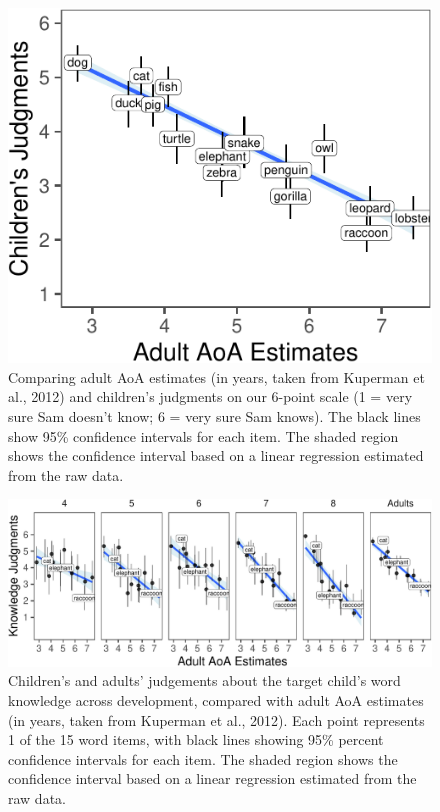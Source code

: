 \documentclass[10pt, letterpaper]{article}
\newenvironment{CodeChunk}{}{}
\begin{document}
\begin{CodeChunk}
\begin{figure}[tb]
\includegraphics{figs/overall-1} \caption[Comparing adult AoA estimates (in years, taken from Kuperman et al., 2012) and children’s judgments on our 6-point scale (1 = very sure Sam doesn’t know]{Comparing adult AoA estimates (in years, taken from Kuperman et al., 2012) and children’s judgments on our 6-point scale (1 = very sure Sam doesn’t know; 6 = very sure Sam knows). The black lines show 95\% confidence intervals for each item. The shaded region shows the confidence interval based on a linear regression estimated from the raw data.}\label{fig:overall}
\end{figure}
\end{CodeChunk}

\begin{CodeChunk}
\begin{figure}[tb]
\includegraphics{figs/development-1} \caption[Children's and adults' judgements about the target child's word knowledge across development, compared with adult AoA estimates (in years, taken from Kuperman et al., 2012)]{Children's and adults' judgements about the target child's word knowledge across development, compared with adult AoA estimates (in years, taken from Kuperman et al., 2012). Each point represents 1 of the 15 word items, with black lines showing 95\% percent confidence intervals for each item. The shaded region shows the confidence interval based on a linear regression estimated from the raw data.}\label{fig:development}
\end{figure}
\end{CodeChunk}
\end{document}
